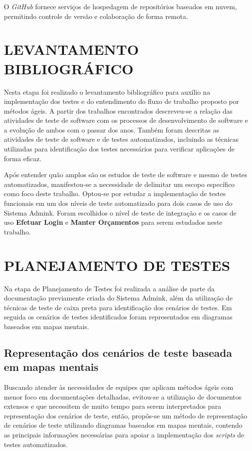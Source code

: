     O \emph{GitHub} fornece serviços de hospedagem de repositórios baseados em nuvem, permitindo controle de versão e colaboração de forma remota.
   
    \section{LEVANTAMENTO BIBLIOGRÁFICO}

        Nesta etapa foi realizado o levantamento bibliográfico para auxílio na implementação dos testes e do entendimento do fluxo de trabalho proposto por métodos ágeis. A partir dos trabalhos encontrados descreveu-se a relação das atividades de teste de software com os processos de desenvolvimento de software e a evolução de ambos com o passar dos anos. Também foram descritas as atividades de teste de software e de testes automatizados, incluindo as técnicas utilizadas para identificação dos testes necessários para verificar aplicações de forma eficaz.

        Após entender quão amplos são os estudos de teste de software e mesmo de testes automatizados, manifestou-se a necessidade de delimitar um escopo específico como foco deste trabalho. Optou-se por estudar a implementação de testes funcionais em um dos níveis de teste automatizado para dois casos de uso do Sistema Admink. Foram escolhidos o nível de teste de integração e os casos de uso \textbf{Efetuar Login} e \textbf{Manter Orçamentos} para serem estudados neste trabalho.

    \section{PLANEJAMENTO DE TESTES}
        
        Na etapa de Planejamento de Testes foi realizada a análise de parte da documentação previamente criada do Sistema Admink, além da utilização de técnicas de teste de caixa preta para identificação dos cenários de testes. Em seguida os cenários de testes identificados foram representados em diagramas baseados em mapas mentais.

        \subsection{Representação dos cenários de teste baseada em mapas mentais}
 
            Buscando atender às necessidades de equipes que aplicam métodos ágeis com menor foco em documentações detalhadas, evitou-se a utilização de documentos extensos e que necessitem de muito tempo para serem interpretados para representação dos cenários de teste, então, propôs-se um método de representação de cenários de teste utilizando diagramas baseados em mapas mentais, contendo as principais informações necessárias para apoiar a implementação dos \emph{scripts} de testes automatizados.
            
